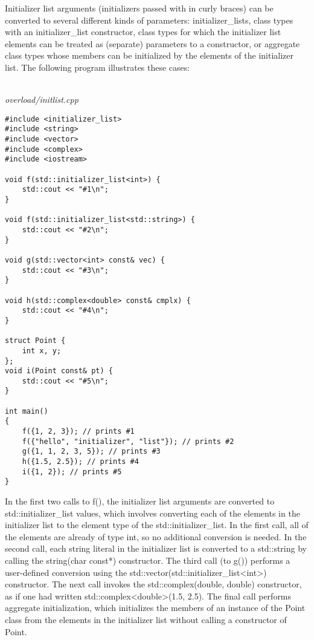 
Initializer list arguments (initializers passed with in curly braces) can be converted to several different kinds of parameters: initializer\_lists, class types with an initializer\_list constructor, class types for which the initializer list elements can be treated as (separate) parameters to a constructor, or aggregate class types whose members can be  initialized by the elements of the initializer list. The following program illustrates these cases:

\hspace*{\fill} \\ %
\noindent
\textit{overload/initlist.cpp}
\begin{lstlisting}[style=styleCXX]
#include <initializer_list>
#include <string>
#include <vector>
#include <complex>
#include <iostream>

void f(std::initializer_list<int>) {
	std::cout << "#1\n";
}

void f(std::initializer_list<std::string>) {
	std::cout << "#2\n";
}

void g(std::vector<int> const& vec) {
	std::cout << "#3\n";
}

void h(std::complex<double> const& cmplx) {
	std::cout << "#4\n";
}

struct Point {
	int x, y;
};
void i(Point const& pt) {
	std::cout << "#5\n";
}

int main()
{
	f({1, 2, 3}); // prints #1
	f({"hello", "initializer", "list"}); // prints #2
	g({1, 1, 2, 3, 5}); // prints #3
	h({1.5, 2.5}); // prints #4
	i({1, 2}); // prints #5
}	
\end{lstlisting}

In the first two calls to f(), the initializer list arguments are converted to std::initializer\_list values, which involves converting each of the elements in the initializer list to the element type of the std::initializer\_list. In the first call, all of the elements are already of type int, so no additional conversion is needed. In the second call, each string literal in the initializer list is converted to a std::string by calling the string(char const*) constructor. The third call (to g()) performs a user-defined conversion using the std::vector(std::initializer\_list<int>) constructor. The next call invokes the std::complex(double, double) constructor, as if one had written std::complex<double>(1.5, 2.5). The final call performs aggregate initialization, which initializes the members of an instance of the Point class from the elements in the initializer list without calling a constructor of Point.

